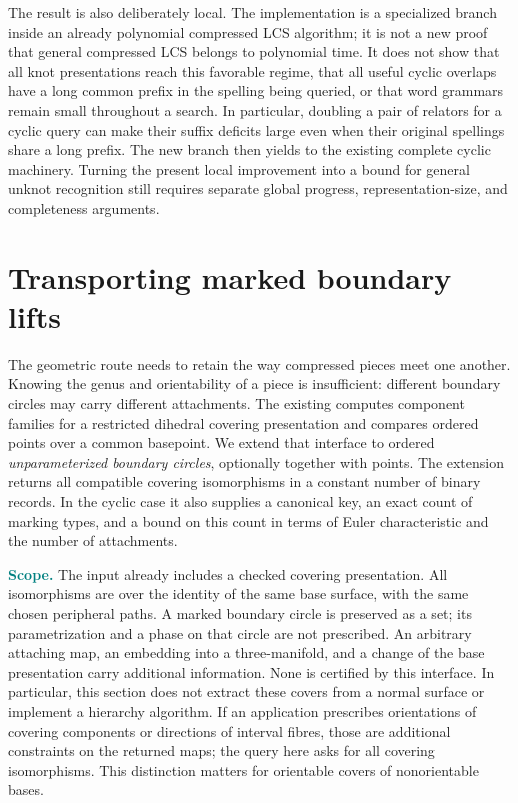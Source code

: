 \documentclass[11pt]{article}
\theoremstyle{definition}
\theoremstyle{remark}
\newcommand{\code}[1]{\texttt{\detokenize{#1}}}
\newcommand{\status}[1]{\textcolor{teal}{\textbf{#1}}}
\begin{document}
The result is also deliberately local. The implementation is a specialized
branch inside an already polynomial compressed LCS algorithm; it is not
a new proof that general compressed LCS belongs to polynomial time.
It does not show that all knot presentations reach this favorable regime,
that all useful cyclic overlaps have a long common prefix in the spelling
being queried, or that word grammars remain small throughout a search.
In particular, doubling a pair of relators for a cyclic query can make
their suffix deficits large even when their original spellings share
a long prefix. The new branch then yields to the existing complete
cyclic machinery. Turning the present local improvement into a bound
for general unknot recognition still requires separate global progress,
representation-size, and completeness arguments.

\section{Transporting marked boundary lifts}\label{sec:transport}

The geometric route needs to retain the way compressed pieces meet one
another.  Knowing the genus and orientability of a piece is insufficient:
different boundary circles may carry different attachments.  The existing
\code{surface_cover.py} computes component families for a restricted
dihedral covering presentation and compares ordered points over a common
basepoint.  We extend that interface to ordered \emph{unparameterized
boundary circles}, optionally together with points.  The extension returns
all compatible covering isomorphisms in a constant number of binary
records.  In the cyclic case it also supplies a canonical key, an exact
count of marking types, and a bound on this count in terms of Euler
characteristic and the number of attachments.

\status{Scope.} The input already includes a checked covering presentation.
All isomorphisms are over the identity of the same base surface, with the
same chosen peripheral paths.  A marked boundary circle is preserved as
a set; its parametrization and a phase on that circle are not prescribed.
An arbitrary attaching map, an embedding into a three-manifold, and a
change of the base presentation carry additional information.  None is
certified by this interface.  In particular, this section does not extract
these covers from a normal surface or implement a hierarchy algorithm.
If an application prescribes orientations of covering components or
directions of interval fibres, those are additional constraints on the
returned maps; the query here asks for all covering isomorphisms.  This
distinction matters for orientable covers of nonorientable bases.
\end{document}
